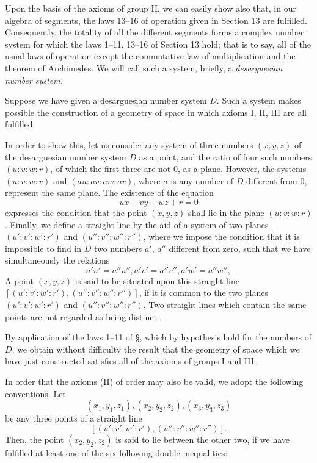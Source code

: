 \documentclass[11pt,oneside]{book}
\begin{document}
Upon the basis of the axioms of group II, we can
easily show also that, in our algebra of segments, the
laws 13--16 of operation given in Section 13 are fulfilled.
Consequently, the totality of all the different segments
forms a complex number system for which the laws
1--11, 13--16 of Section 13 hold; that is to say, all of the
usual laws of operation except the commutative law
of multiplication and the theorem of Archimedes. We
will call such a system, briefly, a \textit{desarguesian number system.}

\label{p29}

Suppose we have given a desarguesian number
system $D$. Such a system makes possible the construction
of a geometry of space in which axioms I,
II, III are all fulfilled.

In order to show this, let us consider any system
of three numbers $(x, y, z)$ of the desarguesian number
system $D$ as a point, and the ratio of four such numbers
$(u:v:w:r)$, of which the first three are not 0,
as a plane. However, the systems $(u:v:w:r)$ and
$(au:av:aw:ar)$, where $a$ is any number of $D$ different
from 0, represent the same plane. The existence of
the equation
\[
ux + vy + wz + r = 0
\]
expresses the condition that the point $(x, y, z)$ shall
lie in the plane $(u:v:w:r)$. Finally, we define a
straight line by the aid of a system of two planes
$(u':v':w':r')$ and $(u'':v'':w'':r'')$, where we impose the
condition that it is impossible to find in $D$ two numbers
$a'$, $a''$ different from zero, such that we have
simultaneously the relations
\[
a'u' = a''u'', a'v' = a''v'', a'w' = a''w'',
\]
A point $(x, y, z)$ is said to be situated upon this
straight line $[(u':v':w':r'), (u'':v'':w'':r'')]$, if it is
common to the two planes $(u':v':w':r')$ and $(u'':v'':w'':r'')$.
Two straight lines which contain the same
points are not regarded as being distinct.

By application of the laws 1--11 of \S{}, which by
hypothesis hold for the numbers of $D$, we obtain without
difficulty the result that the geometry of space
which we have just constructed satisfies all of the axioms
of groups I and III\@.

In order that the axioms (II) of order may also be
valid, we adopt the following conventions. Let
\[
(x_1, y_1, z_1), (x_2, y_2, z_2), (x_3, y_3, z_3)
\]
be any three points of a straight line
\[
[(u':v':w':r'), (u'':v'':w'':r'')].
\]
Then, the point $(x_2, y_2, z_2)$ is said to lie between the
other two, if we have fulfilled at least one of the six
following double inequalities:
\end{document}
